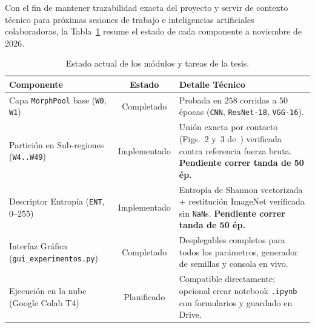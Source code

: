 \documentclass[10pt,a4paper,twocolumn]{article}
\begin{document}
Con el fin de mantener trazabilidad exacta del proyecto y servir de contexto técnico para próximas sesiones de trabajo e inteligencias artificiales colaboradoras, la Tabla~\ref{tab:roadmap} resume el estado de cada componente a noviembre de 2026.

\begin{table}[H]
\centering
\caption{Estado actual de los módulos y tareas de la tesis.}
\label{tab:roadmap}
\footnotesize
\begin{tabularx}{\columnwidth}{p{2.9cm} c X}
\toprule
\textbf{Componente} & \textbf{Estado} & \textbf{Detalle Técnico} \\
\midrule
Capa \texttt{MorphPool} base (\texttt{W0}, \texttt{W1}) & Completado & Probada en $258$ corridas a $50$ épocas (\texttt{CNN}, \texttt{ResNet-18}, \texttt{VGG-16}). \\
Partición en Sub-regiones (\texttt{W4..W49}) & Implementado & Unión exacta por contacto (Figs.~2 y~3 de~\cite{vazquez2019adaptive}) verificada contra referencia fuerza bruta. \textbf{Pendiente correr tanda de 50 ép.} \\
Descriptor Entropía (\texttt{ENT}, $0\text{--}255$) & Implementado & Entropía de Shannon vectorizada + restitución ImageNet verificada sin \texttt{NaN}s. \textbf{Pendiente correr tanda de 50 ép.} \\
Interfaz Gráfica (\texttt{gui\_experimentos.py}) & Completado & Desplegables completos para todos los parámetros, generador de semillas y consola en vivo. \\
Ejecución en la nube (Google Colab T4) & Planificado & Compatible directamente; opcional crear notebook \texttt{.ipynb} con formularios y guardado en Drive. \\
\bottomrule
\end{tabularx}
\end{table}
\end{document}
